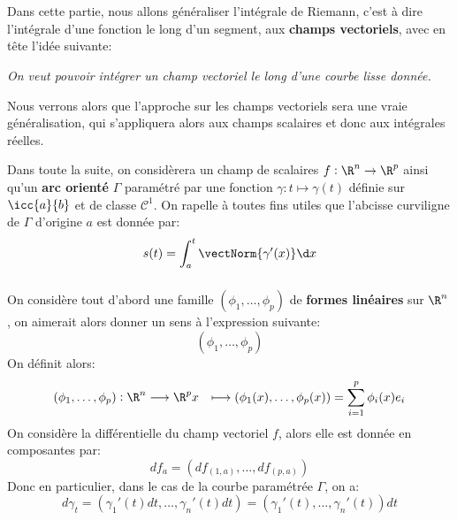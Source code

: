 \subsection*{}


\chapter*{}

Dans cette partie, nous allons généraliser l'intégrale de Riemann, c'est à dire l'intégrale d'une fonction le long d'un segment, aux \textbf{champs vectoriels}, avec en tête l'idée suivante:
\begin{center}
   \textit{On veut pouvoir intégrer un champ vectoriel le long d'une courbe lisse donnée.}
\end{center}
Nous verrons alors que l'approche sur les champs vectoriels sera une vraie généralisation, qui s'appliquera alors aux champs scalaires et donc aux intégrales réelles.\<

Dans toute la suite, on considèrera un champ de scalaires \(f : \R^n \rightarrow \R^p\) ainsi qu'un \textbf{arc orienté} \(\Gamma\) paramétré par une fonction \(\gamma : t \mapsto \gamma(t)\) définie sur \(\icc{a}{b}\) et de classe \(\mathcal{C}^1\). On rapelle à toutes fins utiles que l'abcisse curviligne de \(\Gamma\) d'origine \(a\) est donnée par:
\[
   s(t) = \int_{a}^{t} \vectNorm{\gamma'(x)} \d x   
\] 

\subsection*{}
On considère tout d'abord une famille \((\phi_1, \ldots, \phi_p)\) de \textbf{formes linéaires} sur \(\R^n\), on aimerait alors donner un sens à l'expression suivante:
\[
   (\phi_1, \ldots, \phi_p)   
\]
On définit alors:
\[
   \begin{aligned}
      (\phi_1, \ldots, \phi_p) : \R^n &\longrightarrow \R^p
      x &\longmapsto (\phi_1(x), \ldots, \phi_p(x)) = \sum_{i=1}^{p} \phi_i(x)e_i
   \end{aligned}
\]
On considère la différentielle du champ vectoriel \(f\), alors elle est donnée en composantes par:
\[
   df_a = (df_{(1, a)}, \ldots, df_{(p, a)})   
\]
Donc en particulier, dans le cas de la courbe paramétrée \(\Gamma\), on a:
\[
   d\gamma_t = (\gamma_1'(t) dt, \ldots, \gamma_n'(t) dt) = (\gamma_1'(t), \ldots, \gamma_n'(t))dt  
\]